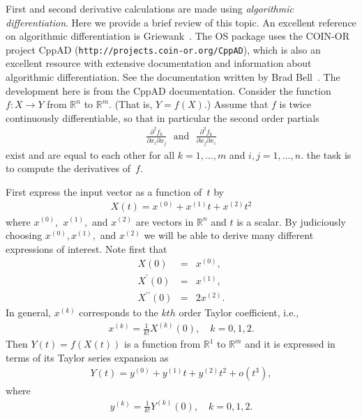 \documentclass[11pt]{article}
\newcommand{\DD}[3]{ \frac{\partial^2 #1}{\partial #2 \partial #3} }
\renewcommand{\_}{{\char"5F}}
\renewcommand{\{}{{\char"7B}}
\renewcommand{\}}{{\char"7D}}
\renewcommand{\^}{{\char"0D}}
\renewcommand{\'}{{\char"0D}}
\newcommand{\UrlCppad}{http://projects.coin-or.org/CppAD}
\begin{document}
\begin{enumerate}[Step 1:]
First and second derivative calculations are made using 
{\it algorithmic differentiation}.
Here we provide a brief review of this topic.  An excellent reference on algorithmic differentiation
is Griewank~\cite{griewank2000}.  The OS package uses the COIN-OR project 
CppAD ({\tt\UrlCppad}), which  is also an excellent resource with extensive  
documentation and information about algorithmic differentiation.
See the documentation written by  Brad Bell~\cite{bell2007}.    
The development here is from the CppAD documentation.  
Consider the function $f:X \rightarrow Y$ from $ \mathbb{R}^{n}$ to $ \mathbb{R}^{m}$.
(That is, $Y = f(X).$) Assume that $f$ is twice continuously differentiable, so that in particular the second order 
partials
\begin{eqnarray}
\DD{f_{k}}{x_{i}}{x_{j}}\ \ \  \mbox{and}\ \ \     \DD{f_{k}}{x_{j}}{x_{i}} \label{eq:mixedPartials}
\end{eqnarray}
exist and are equal to each other for all $k=1,\ldots,m$ and $i,j=1,\ldots,n$. the task is to compute the derivatives 
of~$f$.
 
First express the input vector as a function of~$t$ by
\begin{eqnarray}
X(t) = x^{(0)} +  x^{(1)} t +  x^{(2)} t^{2}
\end{eqnarray}
where $ x^{(0)},$ $x^{(1)},$ and $x^{(2)}$ are vectors in $ \mathbb{R}^{n}$  and $t$ is a scalar.  By judiciously choosing $x^{(0)}, x^{(1)},$ and $x^{(2)}$ we will be able to derive many different expressions of interest.  Note first that
\begin{eqnarray*}
X(0) &=& x^{(0)}, \\
X^{\prime}(0) &=& x^{(1)}, \\
X^{\prime \prime }(0) &=& 2 x^{(2)}.
\end{eqnarray*}
In general,  $x^{(k)}$ corresponds to the $kth$ order Taylor coefficient, i.e.,
\begin{eqnarray}
x^{(k)} = \frac{1}{k!}X^{(k)}(0), \quad k = 0, 1, 2.  \label{eq:xTaylorCoeff}
\end{eqnarray}
Then $Y(t) = f(X(t))$ is a function from $ \mathbb{R}^{1}$ to $ \mathbb{R}^{m}$ and it is expressed in terms of its Taylor series expansion as
\begin{eqnarray}
Y(t)  = y^{(0)} +  y^{(1)} t +  y^{(2)} t^{2} + o(t^{3}),
\end{eqnarray}
where
\begin{eqnarray}
y^{(k)} = \frac{1}{k!} Y^{(k)}(0), \quad k = 0, 1, 2.  \label{eq:yTaylorCoeff}
\end{eqnarray}




\end{enumerate}
\end{document}
